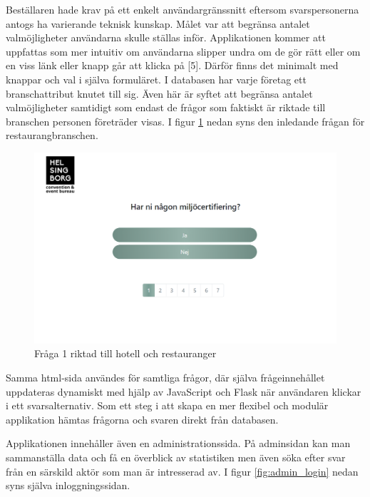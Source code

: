 \documentclass[12pt]{article}
\begin{document}
Beställaren hade krav på ett enkelt användargränssnitt eftersom svarspersonerna antogs ha varierande teknisk kunskap. Målet var att begränsa antalet valmöjligheter användarna skulle ställas inför. Applikationen kommer att uppfattas som mer intuitiv om användarna slipper undra om de gör rätt eller om en viss länk eller knapp går att klicka på [5]. Därför finns det minimalt med knappar och val i själva formuläret. I databasen har varje företag ett branschattribut knutet till sig. Även här är syftet att begränsa antalet valmöjligheter samtidigt som endast de frågor som faktiskt är riktade till branschen personen företräder visas. I figur \ref{fig:question} nedan syns den inledande frågan för restaurangbranschen.


\begin{figure}[H]
    \centering
    \includegraphics[width=12cm]{images/question_page.png}
    \caption{Fråga 1 riktad till hotell och restauranger}
    \label{fig:question}
\end{figure}


Samma html-sida användes för samtliga frågor, där själva frågeinnehållet uppdateras dynamiskt med hjälp av JavaScript och Flask när användaren klickar i ett svarsalternativ. Som ett steg i att skapa en mer flexibel och modulär applikation hämtas frågorna och svaren direkt från databasen.

Applikationen innehåller även en administrationssida.
 På adminsidan kan man sammanställa data och få en överblick av statistiken men även söka efter svar från en särskild aktör som man är intresserad av. I figur \ref{fig:admin_login} nedan syns själva inloggningssidan.
 
\end{document}
